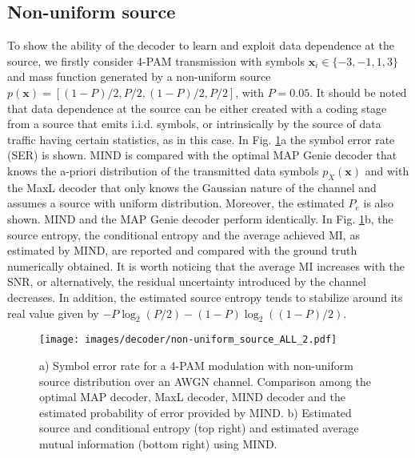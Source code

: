 \subsection{Non-uniform source}
To show the ability of the decoder to learn and exploit data dependence at the source, we firstly consider 4-PAM transmission with symbols $\mathbf{x}_i \in \{-3,-1,1,3\}$ and mass function generated by a non-uniform source $p(\mathbf{x}) = [(1-P)/2, P/2, (1-P)/2, P/2]$, with $P=0.05$. It should be noted that data dependence at the source can be either created with a coding stage from a source that emits i.i.d. symbols, or intrinsically by the source of data traffic having certain statistics, as in this case. In Fig. \ref{fig:MIND_non-uniform_source}a the symbol error rate (SER) is shown. MIND is compared with the optimal MAP Genie decoder that knows the a-priori distribution of the transmitted data symbols $p_X(\mathbf{x})$ and with the MaxL decoder that only knows the Gaussian nature of the channel and assumes a source with uniform distribution. Moreover, the estimated $P_e$ is also shown. MIND and the MAP Genie decoder perform identically. In Fig. \ref{fig:MIND_non-uniform_source}b, the source entropy, the conditional entropy and the average achieved MI, as estimated by MIND, are reported and compared with the ground truth numerically obtained. It is worth noticing that the average MI increases with the SNR, or alternatively, the residual uncertainty introduced by the channel decreases. In addition, the estimated source entropy tends to stabilize around its real value given by $-P\log_2(P/2)-(1-P)\log_2((1-P)/2)$.

\begin{figure}
\centering
  \texttt{[image: images/decoder/non-uniform\_source\_ALL\_2.pdf]}
  \caption{a) Symbol error rate for a 4-PAM modulation with non-uniform source distribution over an AWGN channel. Comparison among the optimal MAP decoder, MaxL decoder, MIND decoder and the estimated probability of error provided by MIND. b) Estimated source and conditional entropy (top right) and estimated average mutual information (bottom right) using MIND.}
	\label{fig:MIND_non-uniform_source}
 \end{figure}

 
